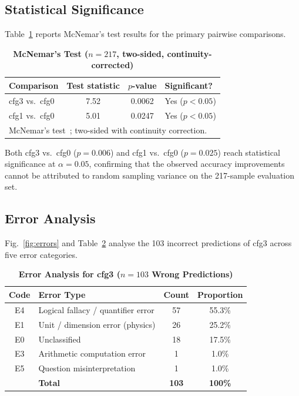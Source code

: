 \documentclass{ieeeaccess}
\begin{document}
\subsection{Statistical Significance}

Table~\ref{tab:mcnemar} reports McNemar's test results for the primary
pairwise comparisons.

\begin{table}[t]
\caption{\textbf{McNemar's Test ($n=217$, two-sided, continuity-corrected)}}
\label{tab:mcnemar}
\centering
\setlength{\tabcolsep}{5pt}
\begin{tabular}{lccl}
\toprule
\textbf{Comparison}
  & \textbf{Test statistic}
  & \textbf{$p$-value}
  & \textbf{Significant?} \\
\midrule
cfg3 vs.\ cfg0 & 7.52 & 0.0062 & Yes ($p<0.05$) \\
cfg1 vs.\ cfg0 & 5.01 & 0.0247 & Yes ($p<0.05$) \\
\bottomrule
\multicolumn{4}{l}{\footnotesize McNemar's test~\cite{b25};
  two-sided with continuity correction.}
\end{tabular}
\end{table}

Both cfg3 vs.\ cfg0 ($p=0.006$) and cfg1 vs.\ cfg0 ($p=0.025$)
reach statistical significance at $\alpha=0.05$, confirming that the
observed accuracy improvements cannot be attributed to random sampling
variance on the 217-sample evaluation set.

\subsection{Error Analysis}

Fig.~\ref{fig:errors} and Table~\ref{tab:errors} analyse the 103
incorrect predictions of cfg3 across five error categories.

\begin{table}[t]
\caption{\textbf{Error Analysis for cfg3 ($n=103$ Wrong Predictions)}}
\label{tab:errors}
\centering
\setlength{\tabcolsep}{4pt}
\begin{tabular}{clcc}
\toprule
\textbf{Code} & \textbf{Error Type}
  & \textbf{Count} & \textbf{Proportion} \\
\midrule
E4 & Logical fallacy / quantifier error     & 57 & 55.3\% \\
E1 & Unit / dimension error (physics)       & 26 & 25.2\% \\
E0 & Unclassified                           & 18 & 17.5\% \\
E3 & Arithmetic computation error           &  1 &  1.0\% \\
E5 & Question misinterpretation             &  1 &  1.0\% \\
\midrule
   & \textbf{Total}          & \textbf{103} & \textbf{100\%} \\
\bottomrule
\end{tabular}
\end{table}
\end{document}
